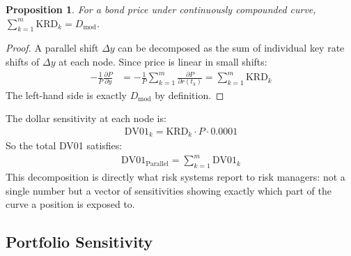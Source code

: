 \documentclass{article}
\theoremstyle{definition}  %
\theoremstyle{plain}  %
\newtheorem{proposition}{Proposition}[section]
\numberwithin{definition}{section}
\numberwithin{proposition}{section}
\numberwithin{theorem}{section}
\numberwithin{equation}{section}
\begin{document}
\begin{proposition}
    For a bond price under continuously compounded curve, $\sum_{k = 1}^{m} \text{KRD}_{k} = D_{\text{mod}}$.
\end{proposition}

\begin{proof}
    A parallel shift $\Delta y$ can be decomposed as the sum of individual key rate shifts of $\Delta y$ at each node. Since price is linear in small shifts:
    \begin{align*}
        - \frac{1}{P} \frac{\partial P}{\partial y} &= - \frac{1}{P} \sum_{k = 1}^{m} \frac{\partial P}{\partial r(t_{k})} = \sum_{k = 1}^{m} \text{KRD}_{k}
    \end{align*}
    The left-hand side is exactly $D_{\text{mod}}$ by definition.
\end{proof}

The dollar sensitivity at each node is:
\begin{align*}
    \text{DV01}_{k} = \text{KRD}_{k} \cdot P \cdot 0.0001
\end{align*}
So the total DV01 satisfies:
\begin{align*}
    \text{DV01}_{\text{Parallel}} = \sum_{k = 1}^{m} \text{DV01}_{k}
\end{align*}
This decomposition is directly what risk systems report to risk managers: not a single number but a vector of sensitivities showing exactly which part of the curve a position is exposed to.

\subsection{Portfolio Sensitivity}
\end{document}
